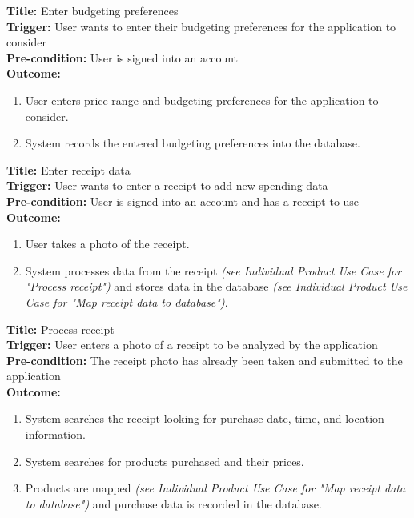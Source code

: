 \documentclass[12pt]{article}
\begin{document}
\medskip
\noindent \textbf{Title:} Enter budgeting preferences\\
\textbf{Trigger:} User wants to enter their budgeting preferences for the application to consider\\
\textbf{Pre-condition:} User is signed into an account\\
\textbf{Outcome:}
\begin{enumerate}
  \item User enters price range and budgeting preferences for the application to consider.
  \item System records the entered budgeting preferences into the database.
\end{enumerate}

\medskip
\noindent \textbf{Title:} Enter receipt data\\
\textbf{Trigger:} User wants to enter a receipt to add new spending data\\
\textbf{Pre-condition:} User is signed into an account and has a receipt to use\\
\textbf{Outcome:}
\begin{enumerate}
  \item User takes a photo of the receipt.
  \item System processes data from the receipt \textit{(see Individual Product
  Use Case for "Process receipt")} and stores data in the database \textit{(see Individual
  Product Use Case for "Map receipt data to database")}.
\end{enumerate}

\pagebreak
\noindent \textbf{Title:} Process receipt\\
\textbf{Trigger:} User enters a photo of a receipt to be analyzed by the application\\
\textbf{Pre-condition:} The receipt photo has already been taken and submitted to the application\\
\textbf{Outcome:}
\begin{enumerate}
  \item System searches the receipt looking for purchase date, time, and location information.
  \item System searches for products purchased and their prices.
  \item Products are mapped \textit{(see Individual Product Use Case for "Map receipt
  data to database")} and purchase data is recorded in the database.
\end{enumerate}
\end{document}
